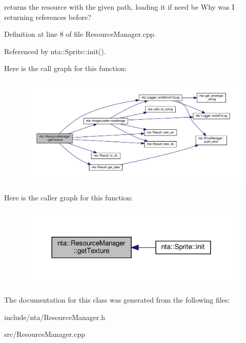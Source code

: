 returns the resource with the given path, loading it if need be  Why was I returning references before? 

Definition at line 8 of file Resource\+Manager.\+cpp.



Referenced by nta\+::\+Sprite\+::init().

Here is the call graph for this function\+:\nopagebreak
\begin{figure}[H]
\begin{center}
\leavevmode
\includegraphics[width=350pt]{d5/d87/classnta_1_1ResourceManager_a60911bfeef0df3802c6ef03cc10fb5c1_cgraph}
\end{center}
\end{figure}
Here is the caller graph for this function\+:\nopagebreak
\begin{figure}[H]
\begin{center}
\leavevmode
\includegraphics[width=312pt]{d5/d87/classnta_1_1ResourceManager_a60911bfeef0df3802c6ef03cc10fb5c1_icgraph}
\end{center}
\end{figure}


The documentation for this class was generated from the following files\+:\begin{DoxyCompactItemize}
\item 
include/nta/Resource\+Manager.\+h\item 
src/Resource\+Manager.\+cpp\end{DoxyCompactItemize}
